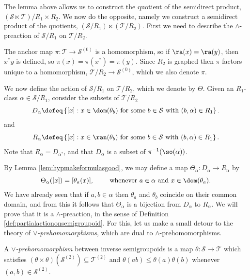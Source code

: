 The lemma above allows us to construct the quotient of the semidirect product, $(\mathcal{S}\ltimes\mathcal{T})/R_1\times R_2$. We now do the opposite, namely we construct a semidirect product of the quotients, $(\mathcal{S}/R_1)\ltimes(\mathcal{T}/R_2)$. First we need to describe the $\land$-preaction of $\mathcal{S}/R_1$ on $\mathcal{T}/R_2$.

The anchor map $\pi\colon\mathcal{T}\to\mathcal{S}^{(0)}$ is a homomorphism, so if $\ra(x)=\ra(y)$, then $x^*y$ is defined, so $\pi(x)=\pi(x^*)=\pi(y)$. Since $R_2$ is graphed then $\pi$ factors unique to a homomorphism, $\mathcal{T}/R_2\to\mathcal{S}^{(0)}$, which we also denote $\pi$.

We now define the action of $\mathcal{S}/R_1$ on $\mathcal{T}/R_2$, which we denote by $\Theta$. Given an $R_1$-class $\alpha\in\mathcal{S}/R_1$, consider the subsets of $\mathcal{T}/R_2$
\[D_\alpha\defeq\left\{[x]:x\in\dom(\theta_b)\text{ for some }b\in\mathcal{S}\text{ with }(b,\alpha)\in R_1\right\}.\]
and
\[R_\alpha\defeq\left\{[x]:x\in\ran(\theta_b)\text{ for some }b\in\mathcal{S}\text{ with }(b,\alpha)\in R_1\right\}.\]
Note that $R_\alpha=D_{\alpha^*}$, and that $D_\alpha$ is a subset of $\pi^{-1}(\so(\alpha))$.

By Lemma \ref{lem:hypmakeformulasgood}, we may define a map $\Theta_{\alpha}\colon D_\alpha\to R_\alpha$ by
\[\Theta_\alpha([x])=[\theta_a(x)],\qquad\text{ whenever }a\in\alpha\text{ and }x\in\dom(\theta_a).\]
We have already seen that if $a,b\in\alpha$ then $\theta_a$ and $\theta_b$ coincide on their common domain, and from this it follows that $\Theta_\alpha$ is a bijection from $D_\alpha$ to $R_\alpha$. We will prove that it is a $\land$-preaction, in the sense of Definition \ref{def:partialactiononsemigroupoid}. For this, let us make a small detour to the theory of \emph{$\lor$-prehomomorphisms}, which are dual to $\land$-prehomomorphisms.

\begin{definition}
A \emph{$\lor$-prehomomorphism} between inverse semigroupoids is a map $\theta\colon\mathcal{S}\to\mathcal{T}$ which satisfies $(\theta\times\theta)(\mathcal{S}^{(2)})\subseteq\mathcal{T}^{(2)}$ and $\theta(ab)\leq\theta(a)\theta(b)$ whenever $(a,b)\in\mathcal{S}^{(2)}$.
\end{definition}

